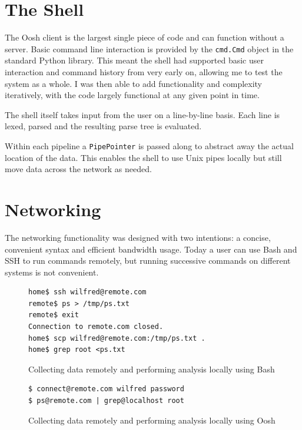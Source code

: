 \documentclass[12pt,twoside,notitlepage]{report}
\begin{document}
\section{The Shell}
The Oosh client is the largest single piece of code and can function without a
server. Basic command line interaction is provided by the {\tt cmd.Cmd} object
in the standard Python library. This meant the shell had supported basic user
interaction and command history from very early on, allowing me to test the
system as a whole. I was then able to add functionality and complexity
iteratively, with the code largely functional at any given point in time.

The shell itself takes input from the user on a line-by-line basis. Each line is
lexed, parsed and the resulting parse tree is evaluated.

Within each pipeline %
a {\tt PipePointer} is passed along to abstract away the actual location of the
data. This enables the shell to use Unix pipes locally %
but still move data across the network as needed.

\section{Networking}
\label{networking}

The networking functionality was designed with two intentions: a concise,
convenient syntax and efficient bandwidth usage. Today a user can use Bash and
SSH to run commands remotely, but running successive commands on different
systems is not convenient.

\begin{figure}
\caption{Collecting data remotely and performing analysis locally
  using Bash}
\begin{verbatim}
home$ ssh wilfred@remote.com
remote$ ps > /tmp/ps.txt
remote$ exit
Connection to remote.com closed.
home$ scp wilfred@remote.com:/tmp/ps.txt .
home$ grep root <ps.txt 
\end{verbatim}
\end{figure}

\begin{figure}
\caption{Collecting data remotely and performing analysis locally
  using Oosh}
\begin{verbatim}
$ connect@remote.com wilfred password
$ ps@remote.com | grep@localhost root
\end{verbatim}
\end{figure}
\end{document}
